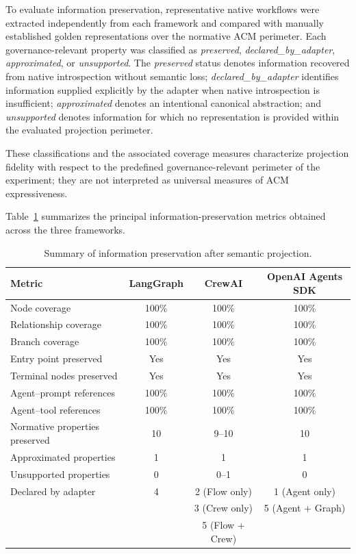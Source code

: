 \documentclass[10pt]{article}
\begin{document}
To evaluate information preservation, representative native workflows were extracted independently from each framework and compared with manually established golden representations over the normative ACM perimeter. Each governance-relevant property was classified as \emph{preserved}, \emph{declared\_by\_adapter}, \emph{approximated}, or \emph{unsupported}. The \emph{preserved} status denotes information recovered from native introspection without semantic loss; \emph{declared\_by\_adapter} identifies information supplied explicitly by the adapter when native introspection is insufficient; \emph{approximated} denotes an intentional canonical abstraction; and \emph{unsupported} denotes information for which no representation is provided within the evaluated projection perimeter.

These classifications and the associated coverage measures characterize projection fidelity with respect to the predefined governance-relevant perimeter of the experiment; they are not interpreted as universal measures of ACM expressiveness.

Table~\ref{tab:projection_results} summarizes the principal information-preservation metrics obtained across the three frameworks.

\begin{table}[t]
	\centering
	\caption{Summary of information preservation after semantic projection.}
	\label{tab:projection_results}
	\small
	\begin{tabular}{lccc}
		\toprule
		\textbf{Metric}
		&
		\textbf{LangGraph}
		&
		\textbf{CrewAI}
		&
		\textbf{OpenAI Agents SDK}
		\\
		\midrule
		Node coverage & 100\% & 100\% & 100\% \\
		Relationship coverage & 100\% & 100\% & 100\% \\
		Branch coverage & 100\% & 100\% & 100\% \\
		Entry point preserved & Yes & Yes & Yes \\
		Terminal nodes preserved & Yes & Yes & Yes \\
		Agent--prompt references & 100\% & 100\% & 100\% \\
		Agent--tool references & 100\% & 100\% & 100\% \\
		Normative properties preserved & 10 & 9--10 & 10 \\
		Approximated properties & 1 & 1 & 1 \\
		Unsupported properties & 0 & 0--1 & 0 \\
		Declared by adapter & 4 & 2 (Flow only) & 1 (Agent only) \\
		         &   & 3 (Crew only) & 5 (Agent + Graph) \\
		         &   & 5 (Flow + Crew) & \\
		\bottomrule
	\end{tabular}
\end{table}
\end{document}

